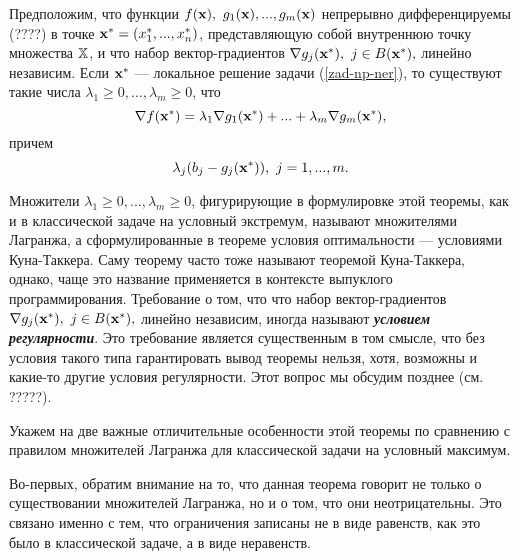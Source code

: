 \begin{teo}
    \label{np-mno-la}
   Предположим, что функции $f(\mathbf{x}), \
    g_{1}(\mathbf{x}),...,g_{m}(\mathbf{x})$  непрерывно дифференцируемы (????) в
    точке $\mathbf{x^{*}}=(x^{*}_{1},...,x^{*}_{n})$, представляющую собой
    внутреннюю точку множества $\mathbb{X}$, и что набор
    вектор-градиентов
    $\nabla g_{j}(\mathbf{x^{*}}), \ j\in B(\mathbf{x^{*}}),$
    линейно независим. Если $\mathbf{x^{*}}$ --- локальное решение
    задачи (\ref{zad-np-ner}), то существуют такие  числа
    $\lambda_{1}\geq0,...,\lambda_{m}\geq0$,
    что
\begin{equation}
    \label{razloj-grad-np}
    \nabla f(\mathbf{x^{*}})=\lambda_{1}\nabla g_{1}(\mathbf{x^{*}})+...
    +\lambda_{m}\nabla g_{m}(\mathbf{x^{*}}),
\end{equation}
    причем
\begin{equation}
    \label{dop-nez-np}
    \lambda_{j}(b_{j}-g_{j}(\mathbf{x^{*}})), \ j=1,...,m.
\end{equation}
\end{teo}



    Множители $\lambda_{1}\geq0,...,\lambda_{m}\geq0$, фигурирующие
    в формулировке этой теоремы, как и в классической задаче на условный экстремум,
    называют множителями Лагранжа,
    а сформулированные в теореме условия оптимальности ---  условиями Куна-Таккера.
    Саму теорему часто тоже называют теоремой Куна-Таккера, однако, чаще
    это название применяется в контексте выпуклого программирования.
    Требование о том, что что набор вектор-градиентов
    $\nabla g_{j}(\mathbf{x^{*}}), \ j\in B(\mathbf{x^{*}}),$
    линейно независим, иногда называют \emph{\textbf{условием
    регулярности}}. Это требование является существенным в том смысле, что без условия
    такого типа гарантировать вывод теоремы нельзя, хотя, возможны и
    какие-то другие условия регулярности. Этот вопрос мы обсудим
    позднее (см. ?????).

    Укажем на две важные отличительные особенности этой теоремы по
    сравнению с правилом множителей Лагранжа
    для классической задачи на условный максимум.

    Во-первых, обратим внимание на то, что данная теорема говорит не
    только о существовании множителей Лагранжа, но и о том, что они
    неотрицательны. Это связано именно с тем, что
    ограничения записаны не в виде равенств, как это было в классической
    задаче, а в виде неравенств.

